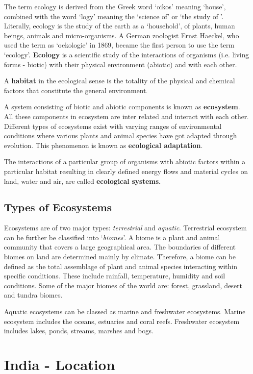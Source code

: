 \documentclass[8pt, a4paper, oneside, twocolumn]{extarticle}
\begin{document}
The term ecology is derived from the Greek word ‘oikos’ meaning ‘house’, combined with the word ‘logy’ meaning the ‘science of’ or ‘the study of ’. Literally, ecology is the study of the earth as a ‘household’, of plants, human beings, animals and micro-organisms. A German zoologist Ernst Haeckel, who used the term as ‘oekologie’ in 1869, became the first person to use the term ‘ecology’. \textbf{Ecology} is a scientific study of the interactions of organisms (i.e. living forms - biotic) with their physical environment (abiotic) and with each other.

A \textbf{habitat} in the ecological sense is the totality of the physical and chemical factors that constitute the general environment. 

A system consisting of biotic and abiotic components is known as \textbf{ecosystem}. All these components in ecosystem are inter related and interact with each other. Different types of ecosystems exist with varying ranges of environmental conditions where various plants and animal species have got adapted through evolution. This phenomenon is known as \textbf{ecological adaptation}.

The interactions of a particular group of organisms with abiotic factors within a particular habitat resulting in clearly defined energy flows and material cycles on land, water and air, are called \textbf{ecological systems}.

\subsection{Types of Ecosystems}
Ecosystems are of two major types: \textit{terrestrial} and \textit{aquatic}. Terrestrial ecosystem can be further be classified into ‘\textit{biomes}’. A biome is a plant and animal community that covers a large geographical area. The boundaries of different biomes on land are determined mainly by climate. Therefore, a biome can be defined as the total assemblage of plant and animal species interacting within specific conditions. These include rainfall, temperature, humidity and soil conditions. Some of the major biomes of the world are: forest, grassland, desert and tundra biomes. 

Aquatic ecosystems can be classed as marine and freshwater ecosystems. Marine ecosystem includes the oceans, estuaries and coral reefs. Freshwater ecosystem includes lakes, ponds, streams, marshes and bogs.
\section{India - Location}
\end{document}

